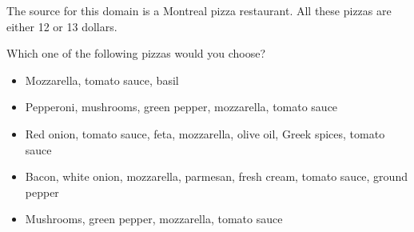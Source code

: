 
The source for this domain is a Montreal pizza restaurant.
All these pizzas are either 12 or 13 dollars.

\begin{tcolorbox}
Which one of the following pizzas would you choose?

\begin{itemize}
	\setlength\itemsep{-5pt}
	\item Mozzarella, tomato sauce, basil
	\item Pepperoni, mushrooms, green pepper, mozzarella, tomato sauce
	\item Red onion, tomato sauce, feta, mozzarella, olive oil, Greek spices,
tomato sauce
	\item Bacon, white onion, mozzarella, parmesan, fresh cream, tomato sauce,
ground pepper
	\item Mushrooms, green pepper, mozzarella, tomato sauce
\end{itemize}
\end{tcolorbox}
